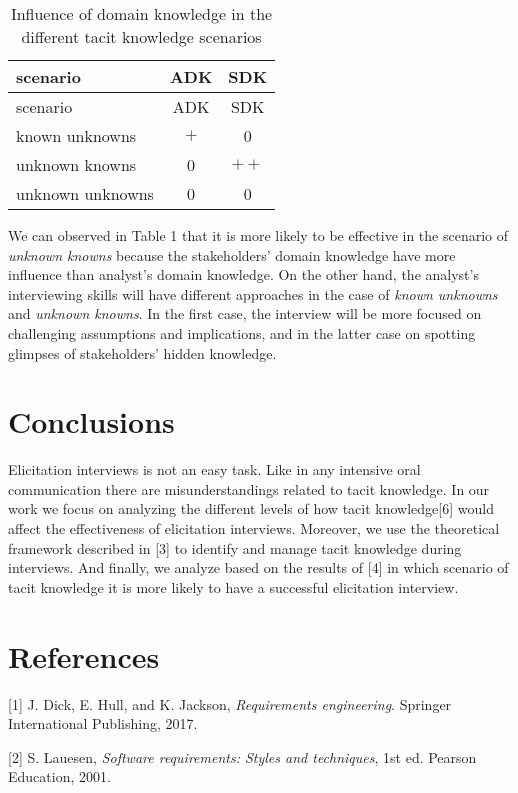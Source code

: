 \documentclass[]{llncs}
\begin{document}
\begin{longtable}[]{@{}lcc@{}}
\caption{Influence of domain knowledge in the different tacit knowledge
scenarios}\tabularnewline
\toprule
scenario & ADK & SDK\tabularnewline
\midrule
\endfirsthead
\toprule
scenario & ADK & SDK\tabularnewline
\midrule
\endhead
known unknowns & \(+\) & 0\tabularnewline
unknown knowns & 0 & \(++\)\tabularnewline
unknown unknowns & 0 & 0\tabularnewline
\bottomrule
\end{longtable}

We can observed in Table 1 that it is more likely to be effective in the
scenario of \emph{unknown knowns} because the stakeholders' domain
knowledge have more influence than analyst's domain knowledge. On the
other hand, the analyst's interviewing skills will have different
approaches in the case of \emph{known unknowns} and \emph{unknown
knowns}. In the first case, the interview will be more focused on
challenging assumptions and implications, and in the latter case on
spotting glimpses of stakeholders' hidden knowledge.

\hypertarget{conclusions}{%
\section{Conclusions}\label{conclusions}}

Elicitation interviews is not an easy task. Like in any intensive oral
communication there are misunderstandings related to tacit knowledge. In
our work we focus on analyzing the different levels of how tacit
knowledge{[}6{]} would affect the effectiveness of elicitation
interviews. Moreover, we use the theoretical framework described in
{[}3{]} to identify and manage tacit knowledge during interviews. And
finally, we analyze based on the results of {[}4{]} in which scenario of
tacit knowledge it is more likely to have a successful elicitation
interview.

\hypertarget{references}{%
\section*{References}\label{references}}

\hypertarget{refs}{}
\leavevmode\hypertarget{ref-dick2017requirements}{}%
{[}1{]} J. Dick, E. Hull, and K. Jackson, \emph{Requirements
engineering}. Springer International Publishing, 2017.

\leavevmode\hypertarget{ref-lauesen2001softwarereq}{}%
{[}2{]} S. Lauesen, \emph{Software requirements: Styles and techniques},
1st ed. Pearson Education, 2001.
\end{document}
